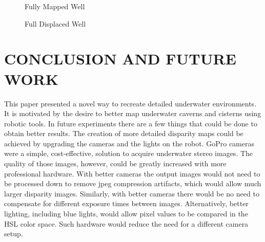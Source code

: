 \documentclass[a4paper,twoside]{article}
\begin{document}
\begin{figure}[!h]
	\centering
		\caption{Fully Mapped Well}
		\label{fig:result4}
\end{figure}

\begin{figure*}[!ht]
   \vspace{-0.2cm}
   \caption{Full Displaced Well}
  \label{fig:resultFull}
 \end{figure*}


\section{\uppercase{Conclusion and Future Work}}
\label{sec:conclusion}

\noindent 
This paper presented a novel way to recreate detailed underwater environments.
It is motivated by the desire to better map underwater caverns and cisterns using robotic tools.  
In future experiments there are a few things that could be done to obtain better results.
The creation of more detailed disparity maps could be achieved by upgrading the cameras and the lights on the robot.  
GoPro cameras were a simple, cost-effective, solution to acquire underwater stereo images.  
The quality of those images, however, could be greatly increased with more professional hardware.  
With better cameras the output images would not need to be processed down to remove jpeg compression artifacts, which would allow much larger disparity images.  
Similarly, with better cameras there would be no need to compensate for different exposure times between images.
Alternatively, better lighting, including blue lights, would allow pixel values to be compared in the HSL color space.  
Such hardware would reduce the need for a different camera setup.
\end{document}
